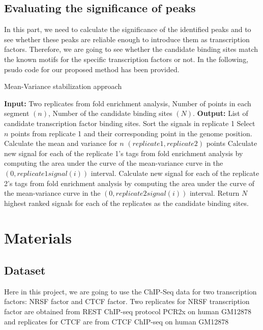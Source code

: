 \documentclass[11pt,letterpaper]{article}
\begin{document}
\subsection{Evaluating the significance of peaks}
In this part, we need to calculate the significance of the identified peaks and to see whether these peaks are reliable enough to introduce them as transcription factors.
Therefore, we are going to see whether the candidate binding sites match the known motifs for the specific transcription factors or not. 
In the following, psudo code for our proposed method has been provided.
\begin{algorithm}[h]
	\caption{Mean-Variance stabilization approach}
	\begin{algorithmic}[1]\baselineskip=14pt\relax
		\State  \textbf{Input:} Two replicates from fold enrichment analysis, Number of points in each segment $(n)$, Number of the candidate binding sites $(N)$.
		\State  \textbf{Output:} List of candidate transcription factor binding sites.
		\State Sort the signals in replicate 1
		\State Select $n$ points from replicate 1 and their corresponding point in the genome position.
		\State Calculate the mean and variance for $n$ $(replicate 1, replicate 2)$ points
		\EndFor
		\State Calculate new signal for each of the replicate 1's tags from fold enrichment analysis by computing the area under the curve of the mean-variance curve in the $(0,replicate 1 signal(i))$ interval.
		\EndFor
		\State Calculate new signal for each of the replicate 2's tags from fold enrichment analysis by computing the area under the curve of the mean-variance curve in the $(0,replicate 2 signal(i))$ interval.
		\EndFor
		\State Return $N$ highest ranked signals for each of the replicates as the candidate binding sites.
	\end{algorithmic}
	\label{alg:mean-var}
\end{algorithm}
\section{Materials}
\subsection{Dataset}
Here in this project, we are going to use the ChIP-Seq data for two transcription factors: NRSF factor and CTCF factor.
Two replicates for NRSF transcription factor are obtained from REST ChIP-seq protocol PCR2x on human GM12878 and replicates for CTCF are from CTCF ChIP-seq on human GM12878
\end{document}
